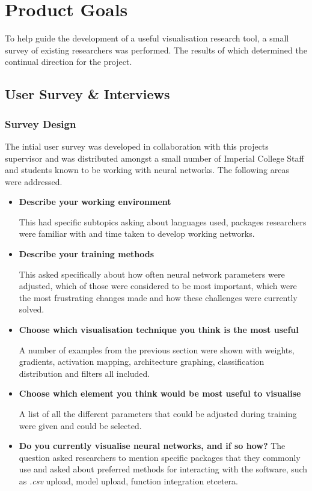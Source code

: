 \documentclass[a4paper,11pt,titlepage]{article}
\begin{document}
\clearpage 

\section{Product Goals}
	To help guide the development of a useful visualisation research tool, a small survey of existing researchers was performed. The results of which determined the continual direction for the project.
	\subsection{User Survey \& Interviews}
	\subsubsection{Survey Design}
	\par
	The intial user survey was developed in collaboration with this projects supervisor and was distributed amongst a small number of Imperial College Staff and students known to be working with neural networks. The following areas were addressed.
	\begin{itemize}
	
		\item \textbf{Describe your working environment}
		\par
		This had specific subtopics asking about languages used, packages researchers were familiar with and time taken to develop working networks.
		\item \textbf{Describe your training methods}
		\par
		This asked specifically about how often neural network parameters were adjusted, which of those were considered to be most important, which were the most frustrating changes made and how these challenges were currently solved.
		\item \textbf{Choose which visualisation technique you think is the most useful}
		\par 
		A number of examples from the previous section were shown with weights, gradients, activation mapping, architecture graphing, classification distribution and filters all included. 
		\item \textbf{Choose which element you think would be most useful to visualise}
		\par 
		A list of all the different parameters that could be adjusted during training were given and could be selected.
		\item \textbf{Do you currently visualise neural networks, and if so how?}
		The question asked researchers to mention specific packages that they commonly use and asked about preferred methods for interacting with the software, such as \textit{.csv} upload, model upload, function integration etcetera.
	
	\end{itemize}
	
\end{document}
